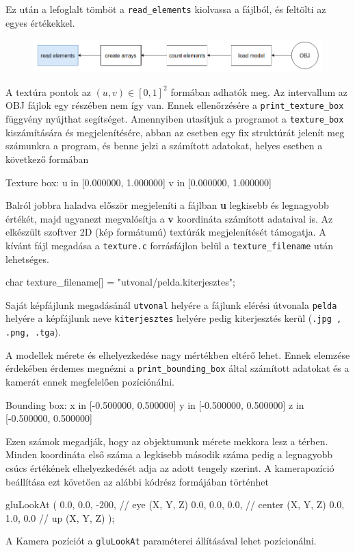 Ez után a lefoglalt tömböt a \texttt{read\_elements} kiolvassa a fájlból, és feltölti az egyes értékekkel.
\begin{figure}[h!]
\centering
\includegraphics[scale=0.5]{images/read.png}
\end{figure}

\newpage


A textúra pontok az $(u, v) \in [0, 1]^2$ formában adhatók meg. Az intervallum az OBJ fájlok egy részében nem így van. Ennek ellenőrzésére a  \texttt{print\_texture\_box} függvény nyújthat segítséget. Amennyiben utasítjuk a programot  a \texttt{texture\_box} kiszámítására és megjelenítésére, abban az esetben egy fix struktúrát jelenít meg számunkra a program, és benne jelzi a számított adatokat, helyes esetben a következő formában
\begin{python}
Texture box:
u in [0.000000, 1.000000]
v in [0.000000, 1.000000]
\end{python}
\bigskip
Balról jobbra haladva először megjeleníti a fájlban \textbf{u} legkisebb és legnagyobb értékét, majd ugyanezt megvalósítja a \textbf{v} koordináta számított adataival is.
Az elkészült szoftver 2D (kép formátumú) textúrák megjelenítését támogatja. A kívánt fájl megadása a \texttt{texture.c} forrásfájlon belül a \texttt{texture\_filename} után lehetséges.
\begin{cpp}
char texture_filename[] = "utvonal/pelda.kiterjesztes";
\end{cpp}
Saját képfájlunk megadásánál \texttt{utvonal} helyére a fájlunk elérési útvonala \texttt{pelda} helyére a képfájlunk neve \texttt{kiterjesztes} helyére pedig kiterjesztés kerül (\texttt{.jpg , .png, .tga}).


A modellek mérete és elhelyezkedése nagy mértékben eltérő lehet. Ennek elemzése érdekében érdemes megnézni a \texttt{print\_bounding\_box} által számított adatokat és a kamerát ennek megfelelően pozíciónálni.
\bigskip
\begin{python}
Bounding box:
x in [-0.500000, 0.500000]
y in [-0.500000, 0.500000]
z in [-0.500000, 0.500000]
\end{python}
\bigskip
Ezen számok megadják, hogy az objektumunk mérete mekkora lesz a térben. Minden koordináta első száma a legkisebb második száma pedig a legnagyobb csúcs értékének elhelyezkedését adja az adott tengely szerint.
A kamerapozíció beállítása ezt követően az alábbi kódrész formájában történhet
\begin{cpp}
gluLookAt
(
    0.0, 0.0, -200, // eye (X, Y, Z)
    0.0, 0.0, 0.0,  // center (X, Y, Z)
    0.0, 1.0, 0.0   // up (X, Y, Z)
);
\end{cpp}
A Kamera pozíciót a \texttt{gluLookAt} paraméterei állításával lehet pozícionálni.


